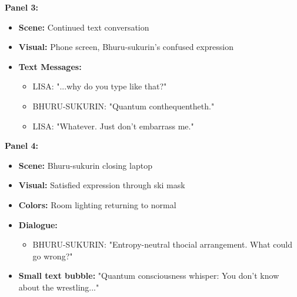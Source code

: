 \documentclass[12pt,a4paper]{article}
\begin{document}
\textbf{Panel 3:}
\begin{itemize}
\item \textbf{Scene:} Continued text conversation
\item \textbf{Visual:} Phone screen, Bhuru-sukurin's confused expression
\item \textbf{Text Messages:}
\begin{itemize}
\item LISA: "...why do you type like that?"
\item BHURU-SUKURIN: "Quantum conthequentheth."
\item LISA: "Whatever. Just don't embarrass me."
\end{itemize}
\end{itemize}

\textbf{Panel 4:}
\begin{itemize}
\item \textbf{Scene:} Bhuru-sukurin closing laptop
\item \textbf{Visual:} Satisfied expression through ski mask
\item \textbf{Colors:} Room lighting returning to normal
\item \textbf{Dialogue:}
\begin{itemize}
\item BHURU-SUKURIN: "Entropy-neutral thocial arrangement. What could go wrong?"
\end{itemize}
\item \textbf{Small text bubble:} "Quantum consciousness whisper: You don't know about the wrestling..."
\end{itemize}
\end{document}
